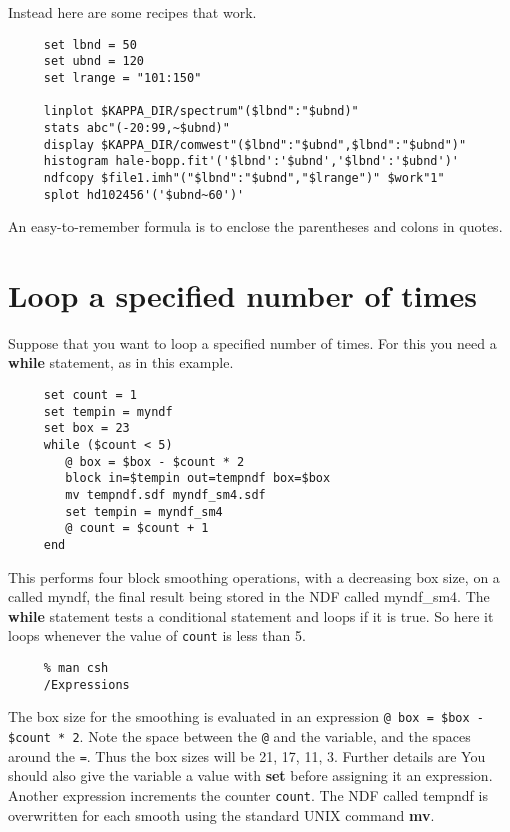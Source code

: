 Instead here are some recipes that work.

\small
\begin{verbatim}
     set lbnd = 50
     set ubnd = 120
     set lrange = "101:150"

     linplot $KAPPA_DIR/spectrum"($lbnd":"$ubnd)"
     stats abc"(-20:99,~$ubnd)"
     display $KAPPA_DIR/comwest"($lbnd":"$ubnd",$lbnd":"$ubnd")"
     histogram hale-bopp.fit'('$lbnd':'$ubnd','$lbnd':'$ubnd')'
     ndfcopy $file1.imh"("$lbnd":"$ubnd","$lrange")" $work"1"
     splot hd102456'('$ubnd~60')'
\end{verbatim}
\normalsize
An easy-to-remember formula is to enclose the parentheses and colons
in quotes.

\newpage
\section{Loop a specified number of times
\label{sc4_se_loop_times}}
Suppose that you want to loop a specified number of times.  For this
you need a {\bf while} statement, as in this example.

\small
\begin{verbatim}
     set count = 1
     set tempin = myndf
     set box = 23
     while ($count < 5)
        @ box = $box - $count * 2
        block in=$tempin out=tempndf box=$box
        mv tempndf.sdf myndf_sm4.sdf
        set tempin = myndf_sm4
        @ count = $count + 1
     end
\end{verbatim}
\normalsize
This performs four block smoothing operations, with a decreasing box
size, on a  called myndf, the final result being
stored in the NDF called myndf\_sm4.  The {\bf while} statement tests
a conditional statement and loops if it is true.  So here it loops
whenever the value of {\tt count} is less than 5.

\small
\begin{verbatim}
     % man csh
     /Expressions
\end{verbatim}
\normalsize

The box size for the smoothing is evaluated in an expression
\mbox{\tt @ box = \$box - \$count * 2}.  Note the space between the
{\tt @} and the variable, and the spaces around the {\tt =}.  Thus
the box sizes will be 21, 17, 11, 3.  Further details are 
You should also give the variable a value with {\bf set} before
assigning it an expression.  Another expression increments the counter
{\tt count}.  The NDF called tempndf is overwritten for each smooth
using the standard UNIX command {\bf mv}.


